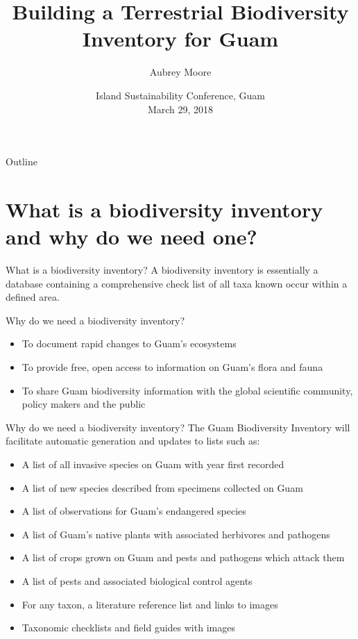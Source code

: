 \documentclass[]{beamer}
\title[Guam Biodiversity Inventory]{Building a Terrestrial Biodiversity Inventory for Guam}
\author{Aubrey Moore}
\institute[University of Guam]{Cooperative Extension Service\\College of Natural and Applied Sciences\\University of Guam}
\date[]{Island Sustainability Conference, Guam\\March 29, 2018}
\begin{document}
\maketitle

\begin{frame}{Outline}
    \tableofcontents
\end{frame}

\section{What is a biodiversity inventory and why do we need one?}

\begin{frame}{What is a biodiversity inventory?}
A biodiversity inventory is essentially a database containing a comprehensive check list of all taxa known occur within a defined area.
\end{frame}

\begin{frame}{Why do we need a biodiversity inventory?}
  \begin{itemize}
      \item To document rapid changes to Guam's ecosystems
      \item To provide free, open access to information on Guam's flora and fauna
      \item To share Guam biodiversity information with the global scientific community, policy makers and the public
  \end{itemize}
\end{frame}

\begin{frame}{Why do we need a biodiversity inventory?}
The Guam Biodiversity Inventory will facilitate automatic generation and updates to lists such as:
\begin{itemize}
\item A list of all invasive species on Guam with year first recorded
\item A list of new species described from specimens collected on Guam 
\item A list of observations for Guam's endangered species
\item A list of Guam's native plants with associated herbivores and pathogens
\item A list of crops grown on Guam and pests and pathogens which attack them
\item A list of pests and associated biological control agents
\item For any taxon, a literature reference list and links to images
\item Taxonomic checklists and field guides with images
\end{itemize}
\end{frame}
\end{document}
